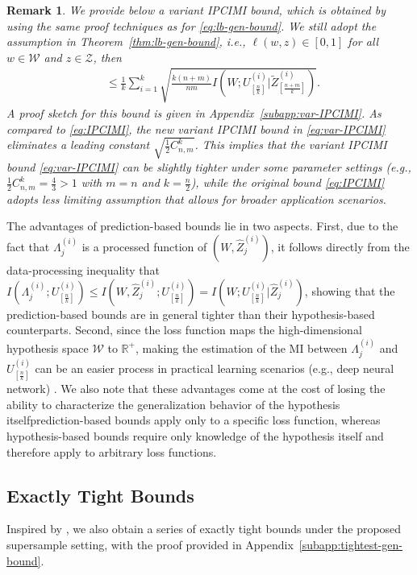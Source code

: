 \documentclass[onecolumn,romanappendices,10pt]{IEEEtran}
\newtheorem{remark}{Remark}
\newcommand{\Wcal}{{\mathcal W}}
\newcommand{\Zcal}{{\mathcal Z}}
\newcommand{\RR}{{\mathbb{R}}}
\DeclareMathOperator{\gen}{\overline{gen}}
\begin{document}
	\begin{remark}
		We provide below a variant IPCIMI bound, which is obtained by using the same proof techniques as for \eqref{eq:lb-gen-bound}. We still adopt the assumption in Theorem~\ref{thm:lb-gen-bound}, i.e., $\ell(w, z) \in [0, 1]$ for all $w \in \Wcal$ and $z \in \Zcal$, then
		\begin{equation}
			\begin{aligned}
				\gen \leq \frac{1}{k} \sum_{i=1}^{k} \sqrt{ \frac{k(n+m)}{nm} I \left( W; U^{(i)}_{[\frac{n}{k}]} | \tilde{Z}^{(i)}_{[\frac{n+m}{k}]} \right) }.
			\end{aligned}\label{eq:var-IPCIMI}
		\end{equation}
		A proof sketch for this bound is given in Appendix~\ref{subapp:var-IPCIMI}. As compared to \eqref{eq:IPCIMI}, the new variant IPCIMI bound in \eqref{eq:var-IPCIMI} eliminates a leading constant $\sqrt{\frac{1}{2}C_{n,m}^k}$. This implies that the variant IPCIMI bound \eqref{eq:var-IPCIMI} can be slightly tighter under some parameter settings (e.g., $\frac{1}{2}C_{n,m}^k = \frac{4}{3} > 1$ with $m=n$ and $k=\frac{n}{2}$), while the original bound \eqref{eq:IPCIMI} adopts less limiting assumption that allows for broader application scenarios.
	\end{remark}
	The advantages of prediction-based bounds lie in two aspects. First, due to the fact that $\Lambda^{(i)}_j$ is a processed function of $(W, \hat{Z}^{(i)}_j)$, it follows directly from the data-processing inequality that $I(\Lambda^{(i)}_j; U^{(i)}_{[\frac{n}{k}]}) \leq I(W, \hat{Z}^{(i)}_j; U^{(i)}_{[\frac{n}{k}]}) = I(W; U^{(i)}_{[\frac{n}{k}]} | \hat{Z}^{(i)}_j)$, showing that the prediction-based bounds are in general tighter than their hypothesis-based counterparts. Second, since the loss function maps the high-dimensional hypothesis space $\Wcal$ to $\RR^+$, making the estimation of the MI between $\Lambda^{(i)}_j$ and $U^{(i)}_{[\frac{n}{k}]}$ can be an easier process in practical learning scenarios (e.g., deep neural network) \cite{harutyunyan2021information,wang2023tighter}. We also note that these advantages come at the cost of losing the ability to characterize the generalization behavior of the hypothesis itself\textemdash prediction-based bounds apply only to a specific loss function, whereas hypothesis-based bounds require only knowledge of the hypothesis itself and therefore apply to arbitrary loss functions.
	
	\subsection{Exactly Tight Bounds}
	Inspired by \cite{haghifam2022understanding,wang2023tighter,dongexactly}, we also obtain a series of exactly tight bounds under the proposed supersample setting, with the proof provided in Appendix~\ref{subapp:tightest-gen-bound}.
	
\end{document}
